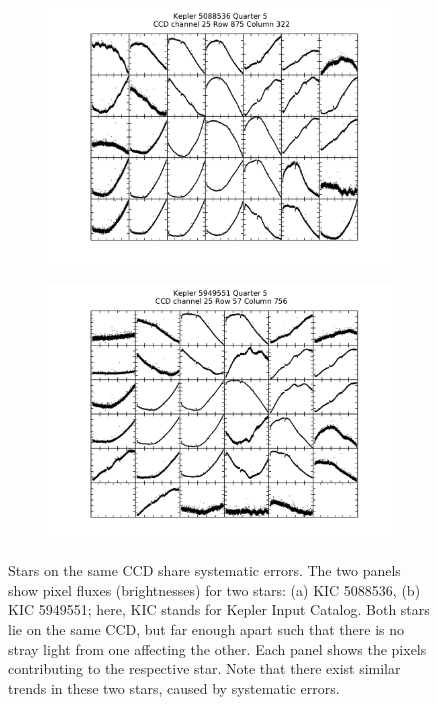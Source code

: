 \documentclass[12pt, preprint]{aastex}
\begin{document}
\begin{figure}[htb]
\centering
\begin{subfigure}[htb]{0.48\columnwidth}
\includegraphics[width=\columnwidth]{5088536-5}
\caption{}
\end{subfigure}%
\hfill
\begin{subfigure}[htb]{0.48\columnwidth}
\includegraphics[width=\columnwidth]{5949551-5}
\caption{}
\end{subfigure}
\caption{
  \label{ccd} 
  Stars on the same CCD share systematic errors. 
  The two panels show pixel fluxes (brightnesses) for two stars: (a) KIC 5088536, (b) KIC 5949551; 
  here, KIC stands for Kepler Input Catalog. Both stars lie on the same CCD, 
  but far enough apart such that there is no stray light from one affecting the other. 
  Each panel shows the pixels contributing to the respective star.
  Note that there exist similar trends in these two stars, caused by systematic errors. 
}
\end{figure}
\end{document}
